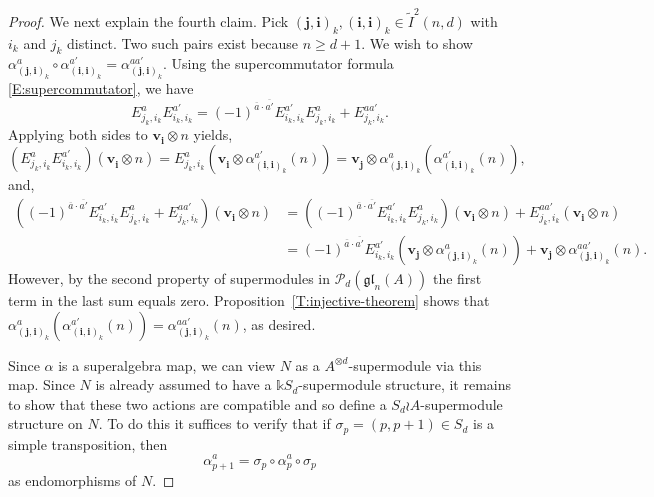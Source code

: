 \documentclass[11pt,reqno]{amsart} %
\newcommand{\gl}{\mathfrak{gl}}
\renewcommand{\k}{\mathds{k}}
\newcommand{\0}{\bar{0}}
\newcommand{\1}{\bar{1}}
\newcommand{\parity}[1]{\overline{#1}}
\newcommand{\wreath}{\wr}
\newcommand{\bv}{\mathbf{v}}
\newcommand{\SdwreathA}{S_{d} \wreath A}
\newcommand{\bi}{\mathbf{i}}
\newcommand{\bj}{\mathbf{j}}
\newcommand{\Itwo}{\tilde{I}^{2}(n,d)}
\newcommand{\Pol}{\mathcal{P}}
\numberwithin{equation}{subsection}
\begin{document}
\begin{proof}
We next explain the fourth claim.  Pick $(\bj , \bi )_{k}, (\bi , \bi )_{k} \in \Itwo$ with $i_{k}$ and $j_{k}$ distinct. Two such pairs exist because $n \geq  d+1$.   We wish to show $\alpha_{(\bj , \bi)_{k}}^{a} \circ \alpha_{(\bi, \bi)_{k}}^{a'} = \alpha_{(\bj , \bi )_{k}}^{aa'}$. Using the supercommutator formula \eqref{E:supercommutator}, we have
\[
E_{j_{k}, i_{k}}^{a}E_{i_{k}, i_{k}}^{a'} = (-1)^{\parity{a}\cdot \parity{a'}} E_{i_{k}, i_{k}}^{a'}E_{j_{k}, i_{k}}^{a} + E_{j_{k}, i_{k}}^{aa'}.
\]  Applying both sides to $\bv^{}_{\bi}  \otimes n$ yields, 
\[
\left(E_{j_{k}, i_{k}}^{a}E_{i_{k}, i_{k}}^{a'} \right) ( \bv^{}_{\bi} \otimes n) = E_{j_{k},i_{k}}^{a}(\bv^{}_{\bi} \otimes \alpha_{(\bi , \bi )_{k}}^{a'}(n)) = \bv^{}_{\bj} \otimes \alpha_{(\bj , \bi )_{k}}^{a}(\alpha_{(\bi , \bi )_{k}}^{a'}(n)),
\] and, 
\begin{align*}
\left((-1)^{\parity{a}\cdot \parity{a'}} E_{i_{k}, i_{k}}^{a'}E_{j_{k}, i_{k}}^{a} + E_{j_{k}, i_{k}}^{aa'} \right) (\bv^{ }_{\bi} \otimes n) &= \left((-1)^{\parity{a}\cdot \parity{a'}}E_{i_{k}, i_{k}}^{a'}E_{j_{k}, i_{k}}^{a}\right) (\bv^{ }_{\bi} \otimes n) + E_{j_{k}, i_{k}}^{aa'} (\bv^{ }_{\bi} \otimes n) \\
& = (-1)^{\parity{a}\cdot \parity{a'}} E_{i_{k}, i_{k}}^{a'}   (\bv^{ }_{\bj} \otimes \alpha^{a}_{(\bj , \bi)_{k}} (n)) +  \bv^{ }_{\bj} \otimes \alpha_{(\bj, \bi )_{k}}^{aa'}(n).
\end{align*}
However, by the second property of supermodules in $\Pol_{d}(\gl_{n}(A))$ the first term in the last sum equals zero.  Proposition~\ref{T:injective-theorem} shows that $\alpha_{(\bj , \bi )_{k}}^{a}(\alpha_{(\bi , \bi )_{k}}^{a'}(n))= \alpha_{(\bj, \bi )_{k}}^{aa'}(n)$, as desired.

Since $\alpha$ is a superalgebra map, we can view $N$ as a $A^{\otimes d}$-supermodule via this map. Since $N$ is already assumed to have a $\k S_{d}$-supermodule structure, it remains to show that these two actions are compatible and so define a $\SdwreathA$-supermodule structure on $N$.  To do this it suffices to verify that if $\sigma_{p} = (p, p+1) \in S_{d}$ is a simple transposition, then 
\[
\alpha_{p+1}^{a}   =  \sigma_{p} \circ \alpha_{p}^{a} \circ \sigma_{p}
\] as endomorphisms of $N$.




\end{proof}
\end{document}
